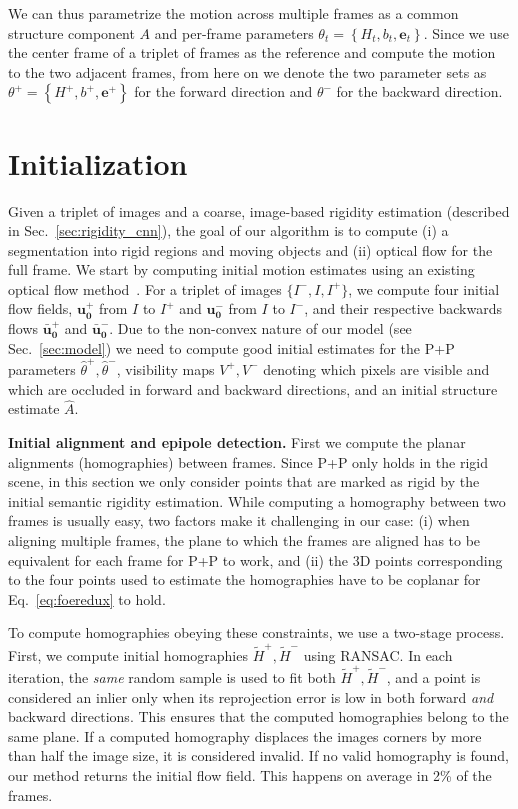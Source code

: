 \documentclass[10pt,twocolumn,letterpaper]{article}
\begin{document}
We can thus parametrize the motion across multiple frames as a common structure component $A$ and per-frame parameters $\theta_t = \left\lbrace H_t, b_t, \mathbf{e}_t \right\rbrace$.
Since we use the center frame of a triplet of frames as the reference and compute the motion to the two adjacent frames, from here on we denote the two parameter sets as $\theta^+ = \left\lbrace H^+, b^+, \mathbf{e}^+ \right\rbrace$ for the forward direction and $\theta^-$ for the backward direction.

%
 \section{Initialization}
\label{sec:initialization_alignment}
\noindent
Given a triplet of images
and a coarse, image-based rigidity estimation (described in Sec.~\ref{sec:rigidity_cnn}), the goal of our algorithm is to compute (i) a segmentation into rigid regions and moving objects and (ii) optical flow for the full frame.
We start by computing initial motion estimates using an existing optical flow method~\cite{Menze2015GCPR}.
For a triplet of images $\lbrace I^-, I, I^+ \rbrace$, we compute four initial flow fields, $\mathbf{u_0^+}$ from $I$ to $I^+$ and $\mathbf{u_0^-}$ from $I$ to $I^-$, and their respective backwards flows $\mathbf{\bar{u}_0^+}$ and $\mathbf{\bar{u}_0^-}$. 
Due to the non-convex nature of our model (see Sec.~\ref{sec:model}) we need to compute good initial estimates for the P+P parameters $\hat{\theta}^+, \hat{\theta}^-$, visibility maps $V^+, V^-$ denoting which pixels are visible and which are occluded in forward and backward directions, and an initial structure estimate $\hat{A}$.

{\bf Initial alignment and epipole detection.}
\noindent
First we compute the planar alignments (homographies) between frames.
Since P+P only holds in the rigid scene, in this section we only consider points that are marked as rigid by the initial semantic rigidity estimation.
While computing a homography between two frames is usually easy, two factors make it challenging in our case: (i) when aligning multiple frames, the plane to which the frames are aligned has to be equivalent for each frame for P+P to work, and (ii) the 3D points corresponding to the four points used to estimate the homographies have to be coplanar for Eq.~\eqref{eq:foeredux} to hold.


To compute homographies obeying these constraints, we use a two-stage process.
First, we compute initial homographies $\tilde{H}^+, \tilde{H}^-$ using RANSAC.
In each iteration, the \textit{same} random sample is used to fit both $\tilde{H}^+, \tilde{H}^-$, and a point is considered an inlier only when its reprojection error is low in both forward \textit{and} backward directions.
This ensures that the computed homographies belong to the same plane.
If a computed homography displaces the images corners by more than half the image size, it is considered invalid.
If no valid homography is found, our method returns the initial flow field. This happens on average in 2\% of the frames.
\end{document}
